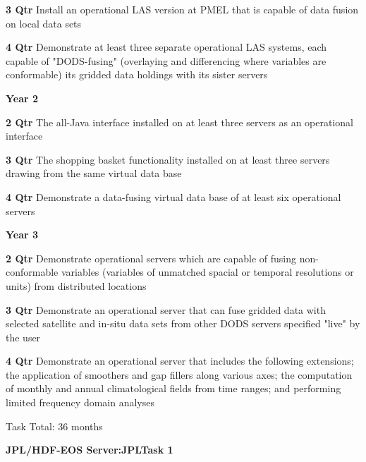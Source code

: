 \documentclass[12pt]{article}
\begin{document}
\begin{description}
\begin{description}
   \item{\bf 3 Qtr} Install an operational LAS version at PMEL that is
     capable of data fusion on local data sets 

   \item{\bf 4 Qtr} Demonstrate at least three separate operational LAS
     systems, each capable of "DODS-fusing" (overlaying and differencing
     where variables are conformable) its gridded data holdings with its
     sister servers

   \end{description}
 \item{\large \bf Year 2}
   \begin{description}

   \item{\bf 2 Qtr} The all-Java interface installed on at least three
     servers as an operational interface

   \item{\bf 3 Qtr} The shopping basket functionality installed on at least
     three servers drawing from the same virtual data base 

   \item{\bf 4 Qtr} Demonstrate a data-fusing virtual data base of at least
     six operational servers 

   \end{description}
 \item{\large \bf Year 3}
   \begin{description}

   \item{\bf 2 Qtr} Demonstrate operational servers which are capable of
     fusing non-conformable variables (variables of unmatched spacial or
     temporal resolutions or units) from distributed locations

   \item{\bf 3 Qtr} Demonstrate an operational server that can fuse gridded
     data with selected satellite and in-situ data sets from other DODS
     servers specified "live" by the user

   \item{\bf 4 Qtr} Demonstrate an operational server that includes the
     following extensions; the application of smoothers and gap fillers along
     various axes; the computation of monthly and annual climatological
     fields from time ranges; and performing limited frequency domain
     analyses 

 Task Total: 36 months


   \end{description}
\begin{center}
{\large \bf JPL/HDF-EOS Server:JPLTask 1}
\end{center}


\end{description}
\end{document}
